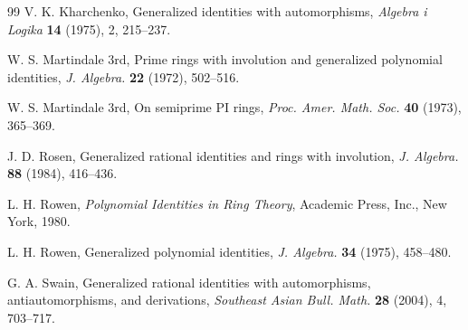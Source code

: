 \documentclass{cimart}
\begin{document}
\begin{thebibliography}{99}
	 V. K. Kharchenko, Generalized identities with automorphisms, \textit{Algebra i Logika} \textbf{14} (1975),  2, 215–237. 
	
	W. S. Martindale 3rd, { Prime rings with involution and generalized polynomial identities}, {\it J. Algebra.} {\bf 22} (1972), 502--516.
	
	 W. S. Martindale 3rd, { On semiprime PI rings}, {\it Proc. Amer. Math. Soc.} {\bf  40} (1973), 365--369.
	
	J. D. Rosen, Generalized rational identities and rings with involution, {\it J. Algebra.} {\bf 88} (1984), 416--436.
	
	 L. H. Rowen, \textit{Polynomial Identities in Ring Theory}, Academic Press, Inc., New York, 1980.
	
	L. H. Rowen, { Generalized polynomial identities},  {\it J. Algebra.} {\bf 34} (1975), 458--480. 	
	
	 G. A. Swain, Generalized rational identities with automorphisms, antiautomorphisms, and derivations, \textit{Southeast Asian Bull. Math.} \textbf{28} (2004), 4, 703–717.
	
\end{thebibliography}
	

\end{document}
